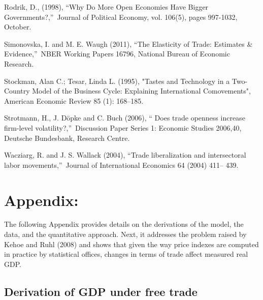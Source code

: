 \documentclass[12pt]{article}
\begin{document}
\begin{thebibliography}{99}
\bibitem{} Rodrik, D., (1998), \textquotedblleft Why Do More Open Economies
Have Bigger Governments?,\textquotedblright\ Journal of Political Economy,
vol. 106(5), pages 997-1032, October.

\bibitem{} Simonovska, I. and M. E. Waugh (2011), \textquotedblleft The
Elasticity of Trade: Estimates \& Evidence,\textquotedblright\ NBER Working
Papers 16796, National Bureau of Economic Research.

\bibitem{} Stockman, Alan C.; Tesar, Linda L. (1995), "Tastes and Technology
in a Two-Country Model of the Business Cycle: Explaining International
Comovements", American Economic Review 85 (1): 168--185.

\bibitem{} Strotmann, H., J. D\"{o}pke and C. Buch (2006), \textquotedblleft
Does trade openness increase firm-level volatility?,\textquotedblright\
Discussion Paper Series 1: Economic Studies 2006,40, Deutsche Bundesbank,
Research Centre.

\bibitem{} Wacziarg, R. and J. S. Wallack (2004), \textquotedblleft Trade
liberalization and intersectoral labor movements,\textquotedblright\ Journal
of International Economics 64 (2004) 411-- 439.
\end{thebibliography}

\section{\textbf{Appendix:}}

The following Appendix provides details on the derivations of the model, the
data, and the quantitative approach. Next, it addresses the problem raised
by Kehoe and Ruhl (2008) and shows that given the way price indexes are
computed in practice by statistical offices, changes in terms of trade
affect measured real GDP.

\subsection{Derivation of GDP under free trade}
\end{document}
